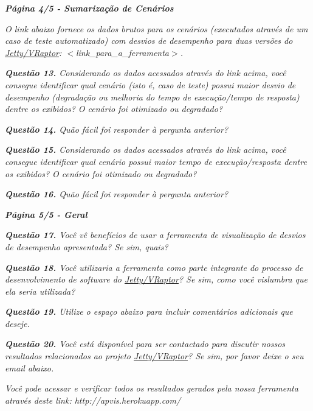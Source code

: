 \begin{framed}
	\noindent \textit{\textbf{Página 4/5 - Sumarização de Cenários}}
	\par
	\noindent \textit{O link abaixo fornece os dados brutos para os cenários (executados através de um caso de teste automatizado) com desvios de desempenho para duas versões do \underline{Jetty/VRaptor}: {\(<\)}link\_para\_a\_ferramenta{\(>\)}.}
	\par
	\noindent \textit{\textbf{Questão 13.} Considerando os dados acessados através do link acima, você consegue identificar qual cenário (isto é, caso de teste) possui maior desvio de desempenho (degradação ou melhoria do tempo de execução/tempo de resposta) dentre os exibidos? O cenário foi otimizado ou degradado?}
	\par
	\noindent \textit{\textbf{Questão 14.} Quão fácil foi responder à pergunta anterior?}
	\par
	\noindent \textit{\textbf{Questão 15.} Considerando os dados acessados através do link acima, você consegue identificar qual cenário possui maior tempo de execução/resposta dentre os exibidos? O cenário foi otimizado ou degradado?}
	\par
	\noindent \textit{\textbf{Questão 16.} Quão fácil foi responder à pergunta anterior?}
\end{framed}

\begin{framed}
	\noindent \textit{\textbf{Página 5/5 - Geral}}
	\par
	\noindent \textit{\textbf{Questão 17.} Você vê benefícios de usar a ferramenta de visualização de desvios de desempenho apresentada? Se sim, quais?}
	\par
	\noindent \textit{\textbf{Questão 18.} Você utilizaria a ferramenta como parte integrante do processo de desenvolvimento de software do \underline{Jetty/VRaptor}? Se sim, como você vislumbra que ela seria utilizada?}
	\par
	\noindent \textit{\textbf{Questão 19.} Utilize o espaço abaixo para incluir comentários adicionais que deseje.}
	\par
	\noindent \textit{\textbf{Questão 20.} Você está disponível para ser contactado para discutir nossos resultados relacionados ao projeto \underline{Jetty/VRaptor}? Se sim, por favor deixe o seu email abaixo.}

	\noindent \textit{Você pode acessar e verificar todos os resultados gerados pela nossa ferramenta através deste link: http://apvis.herokuapp.com/}
\end{framed}

